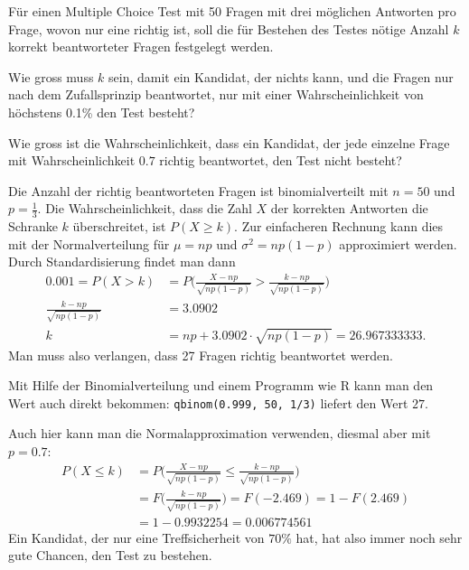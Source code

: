 Für einen Multiple Choice Test mit 50 Fragen mit drei möglichen Antworten
pro Frage, wovon nur eine richtig ist, soll die für
Bestehen des Testes nötige Anzahl $k$ korrekt beantworteter Fragen
festgelegt werden.
\begin{teilaufgaben}
\item Wie gross muss $k$ sein, damit ein Kandidat,
der nichts kann, und die Fragen nur nach dem Zufallsprinzip beantwortet,
nur mit einer Wahrscheinlichkeit von höchstens 0.1\% den Test besteht?
\item Wie gross ist die Wahrscheinlichkeit, dass ein Kandidat, der jede
einzelne Frage mit Wahrscheinlichkeit $0.7$ richtig beantwortet, den
Test nicht besteht?
\end{teilaufgaben}


\begin{loesung}
\begin{teilaufgaben}
\item Die Anzahl der richtig beantworteten Fragen ist binomialverteilt
mit $n=50$ und $p=\frac13$. Die Wahrscheinlichkeit, dass die Zahl $X$
der korrekten Antworten die Schranke $k$ überschreitet, ist $P(X\ge k)$.
Zur einfacheren Rechnung kann dies mit der Normalverteilung für
$\mu = np$ und $\sigma^2=np(1-p)$ approximiert werden. Durch Standardisierung
findet man dann
\begin{align*}
0.001=P(X>k)
&=
P\biggl(
\frac{X-np}{\sqrt{np(1-p)}}>\frac{k-np}{\sqrt{np(1-p)}}
\biggr)
\\
\frac{k-np}{\sqrt{np(1-p)}}&=3.0902
\\
k&= np+3.0902\cdot \sqrt{np(1-p)}
=26.967333333.
\end{align*}
Man muss also verlangen, dass 27 Fragen richtig beantwortet werden.

Mit Hilfe der Binomialverteilung und einem Programm wie R kann man den
Wert auch direkt bekommen:
\texttt{qbinom(0.999, 50, 1/3)}
liefert den Wert $27$.
\item
Auch hier kann man die Normalapproximation verwenden, diesmal aber mit
$p=0.7$:
\begin{align*}
P(X\le k)&=
P\biggl(
\frac{X-np}{\sqrt{np(1-p)}}\le\frac{k-np}{\sqrt{np(1-p)}}
\biggr)
\\
&=F\biggl(
\frac{k-np}{\sqrt{np(1-p)}}
\biggr)
=F(-2.469)=1-F(2.469)
\\
&=1-0.9932254=0.006774561
\end{align*}
Ein Kandidat, der nur eine Treffsicherheit von $70\%$ hat, hat also
immer noch sehr gute Chancen, den Test zu bestehen.
\qedhere
\end{teilaufgaben}
\end{loesung}

